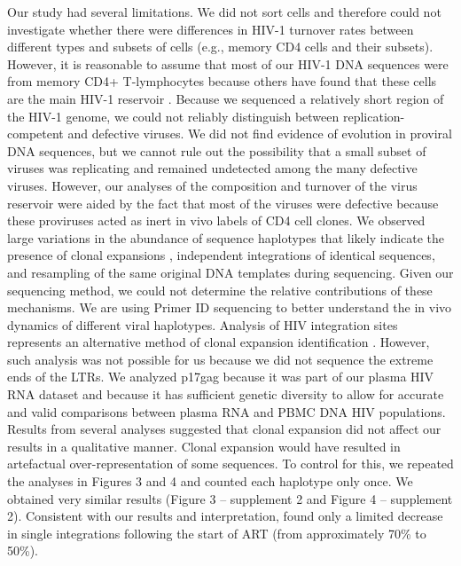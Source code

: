 \documentclass[aps,rmp,onecolumn,linenumbers]{revtex4-1}
\begin{document}
Our study had several limitations. We did not sort cells and therefore could not investigate whether there were differences in HIV-1 turnover rates between different types and subsets of cells (e.g., memory CD4 cells and their subsets). However, it is reasonable to assume that most of our HIV-1 DNA sequences were from memory CD4+ T-lymphocytes because others have found that these cells are the main HIV-1 reservoir \cite{eriksson_comparative_2013,chun_quantification_1997,chun_vivo_1995}. 
Because we sequenced a relatively short region of the HIV-1 genome, we could not reliably distinguish between replication-competent and defective viruses. We did not find evidence of evolution in proviral DNA sequences, but we cannot rule out the possibility that a small subset of viruses was replicating and remained undetected among the many defective viruses. However, our analyses of the composition and turnover of the virus reservoir were aided by the fact that most of the viruses were defective because these proviruses acted as inert in vivo labels of CD4 cell clones.
We observed large variations in the abundance of sequence haplotypes that likely indicate the presence of clonal expansions \cite{josefsson_hiv-1_2013,stockenstrom_longitudinal_2015}, independent integrations of identical sequences, and resampling of the same original DNA templates during sequencing. 
Given our sequencing method, we could not determine the relative contributions of these mechanisms. We are using Primer ID sequencing \cite{jabara_accurate_2011} to better understand the in vivo dynamics of different viral haplotypes. Analysis of HIV integration sites represents an alternative method of clonal expansion identification \cite{maldarelli_specific_2014,cohn_hiv-1_2015}. However, such analysis was not possible for us because we did not sequence the extreme ends of the LTRs. We analyzed p17gag because it was part of our plasma HIV RNA dataset and because it has sufficient genetic diversity to allow for accurate and valid comparisons between plasma RNA and PBMC DNA HIV populations. Results from several analyses suggested that clonal expansion did not affect our results in a qualitative manner. Clonal expansion would have resulted in artefactual over-representation of some sequences. To control for this, we repeated the analyses in Figures 3 and 4 and counted each haplotype only once. We obtained very similar results (Figure 3 -- supplement 2 and Figure 4 -- supplement 2). Consistent with our results and interpretation, \citet{cohn_hiv-1_2015} found only a limited decrease in single integrations following the start of ART (from approximately 70\% to 50\%).
\end{document}
